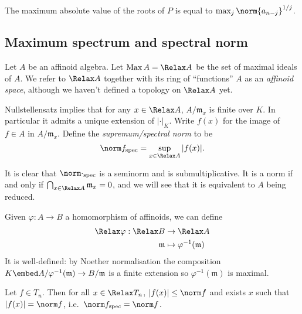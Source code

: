 \documentclass[a4paper]{article}
\let\Sp\Relax
\DeclareMathOperator{\Sp}{Sp} %
\begin{document}
\begin{corollary}
  The maximum absolute value of the roots of \(P\) is equal to \(\max_j \norm{a_{n - j}}^{1/j}\).
\end{corollary}

\subsection{Maximum spectrum and spectral norm}

Let \(A\) be an affinoid algebra. Let \(\operatorname{Max} A = \Sp A\) be the set of maximal ideals of \(A\). We refer to \(\Sp A\) together with its ring of ``functions'' \(A\) as an \emph{affinoid space}, although we haven't defined a topology on \(\Sp A\) yet.

Nullstellensatz implies that for any \(x \in \Sp A\), \(A/\mathfrak m_x\) is finite over \(K\). In particular it admits a unique extension of \(|\cdot|_K\). Write \(f(x)\) for the image of \(f \in A\) in \(A/\mathfrak m_x\). Define the \emph{supremum/spectral norm} to be
\[
  \norm f_{\mathrm{spec}} = \sup_{x \in \Sp A} |f(x)|.
\]

It is clear that \(\norm \cdot_{\mathrm{spec}}\) is a seminorm and is submultiplicative. It is a norm if and only if \(\bigcap_{x \in \Sp A} \mathfrak m_x = 0\), and we will see that it is equivalent to \(A\) being reduced.

Given \(\varphi: A \to B\) a homomorphism of affinoids, we can define
\begin{align*}
  \Sp \varphi: \Sp B &\to \Sp A \\
  \mathfrak m &\mapsto \varphi^{-1}(\mathfrak m)
\end{align*}
It is well-defined: by Noether normalisation the composition \(K \embed A/\varphi^{-1}(\mathfrak m) \to B/\mathfrak m\) is a finite extension so \(\varphi^{-1}(\mathfrak m)\) is maximal.

\begin{lemma}
  Let \(f \in T_n\). Then for all \(x \in \Sp T_n\), \(|f(x)| \leq \norm f\) and exists \(x\) such that \(|f(x)| = \norm f\), i.e.\ \(\norm f_{\mathrm{spec}} = \norm f\).
\end{lemma}
\end{document}
